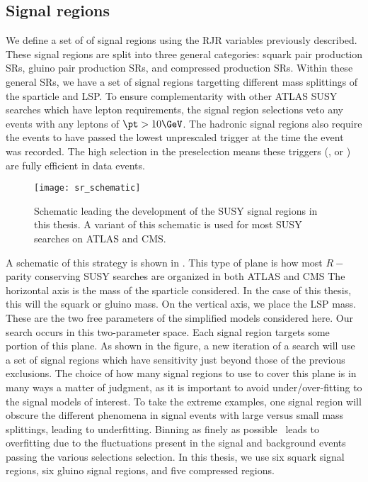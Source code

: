 

\subsection{Signal regions}
We define a set of of signal regions using the RJR variables previously described.
These signal regions are split into three general categories: squark pair production SRs, gluino pair production SRs, and compressed production SRs.
Within these general SRs, we have a set of signal regions targetting different mass splittings of the sparticle and LSP.
To ensure complementarity with other ATLAS SUSY searches which have lepton requirements, the signal region selections veto any events with any leptons of $\pt > 10 \GeV$.
The hadronic signal regions also require the events to have passed the lowest unprescaled \met trigger at the time the event was recorded.
The high \met selection in the preselection means these triggers (,  or ) are fully efficient in data events.
\begin{figure}[tbp]
\caption{Schematic leading the development of the SUSY signal regions in this thesis.
A variant of this schematic is used for most SUSY searches on ATLAS and CMS.
} \label{fig:sr_schematic}
\texttt{[image: sr\_schematic]}
\end{figure}

A schematic of this strategy is shown in .
This type of plane is how most $R-$parity conserving SUSY searches are organized in both ATLAS and CMS
The horizontal axis is the mass of the sparticle considered.
In the case of this thesis, this will the squark or gluino mass.
On the vertical axis, we place the LSP mass.
These are the two free parameters of the simplified models considered here.
Our search occurs in this two-parameter space.
Each signal region targets some portion of this plane.
As shown in the figure, a new iteration of a search will use a set of signal regions which have sensitivity just beyond those of the previous exclusions.
The choice of how many signal regions to use to cover this plane is in many ways a matter of judgment, as it is important to avoid under/over-fitting to the signal models of interest.
To take the extreme examples, one signal region will obscure the different phenomena in signal events with large versus small mass splittings, leading to underfitting.
Binning as finely as possible\footnotemark~ leads to overfitting due to the fluctuations present in the signal and background events passing the various selections selection.
In this thesis, we use six squark signal regions, six gluino signal regions, and five compressed regions.

